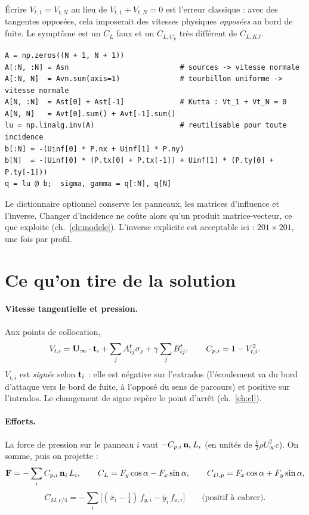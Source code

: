 \begin{piege}
Écrire $V_{t,1}=V_{t,N}$ au lieu de $V_{t,1}+V_{t,N}=0$ est l'erreur classique : avec des tangentes opposées, cela imposerait des vitesses physiques \emph{opposées} au bord de fuite. Le symptôme est un $C_L$ faux et un $C_{L,C_p}$ très différent de $C_{L,KJ}$.
\end{piege}

\begin{codebox}
\begin{lstlisting}
A = np.zeros((N + 1, N + 1))
A[:N, :N] = Asn                          # sources -> vitesse normale
A[:N, N]  = Avn.sum(axis=1)              # tourbillon uniforme -> vitesse normale
A[N, :N]  = Ast[0] + Ast[-1]             # Kutta : Vt_1 + Vt_N = 0
A[N, N]   = Avt[0].sum() + Avt[-1].sum()
lu = np.linalg.inv(A)                    # reutilisable pour toute incidence
b[:N] = -(Uinf[0] * P.nx + Uinf[1] * P.ny)
b[N]  = -(Uinf[0] * (P.tx[0] + P.tx[-1]) + Uinf[1] * (P.ty[0] + P.ty[-1]))
q = lu @ b;  sigma, gamma = q[:N], q[N]
\end{lstlisting}
Le dictionnaire optionnel  conserve les panneaux, les matrices d'influence et l'inverse. Changer d'incidence ne coûte alors qu'un produit matrice-vecteur, ce que  exploite (ch.~\ref{ch:modele}). L'inverse explicite est acceptable ici : $201\times201$, une fois par profil.
\end{codebox}

\section{Ce qu'on tire de la solution}
\paragraph{Vitesse tangentielle et pression.} Aux points de collocation,
\[
V_{t,i}=\mathbf{U}_\infty\cdot\mathbf{t}_i+\sum_jA^t_{ij}\sigma_j+\gamma\sum_jB^t_{ij},\qquad C_{p,i}=1-V_{t,i}^2 .
\]
$V_{t,i}$ est \emph{signée} selon $\mathbf{t}_i$ : elle est négative sur l'extrados (l'écoulement va du bord d'attaque vers le bord de fuite, à l'opposé du sens de parcours) et positive sur l'intrados. Le changement de signe repère le point d'arrêt (ch.~\ref{ch:cl}).

\paragraph{Efforts.} La force de pression sur le panneau $i$ vaut $-C_{p,i}\,\mathbf{n}_i\,L_i$ (en unités de $\tfrac12\rho U_\infty^2c$). On somme, puis on projette :
\[
\mathbf{F}=-\sum_iC_{p,i}\,\mathbf{n}_i\,L_i,\qquad
C_L=F_y\cos\alpha-F_x\sin\alpha,\qquad C_{D,p}=F_x\cos\alpha+F_y\sin\alpha,
\]
\[
C_{M,c/4}=-\sum_i\Big[(\bar x_i-\tfrac14)\,f_{y,i}-\bar y_i\,f_{x,i}\Big]\qquad\text{(positif à cabrer).}
\]

